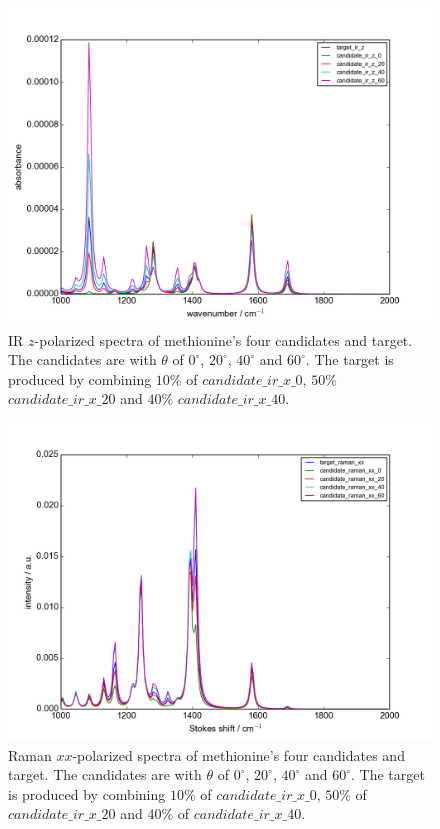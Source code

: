 \begin{figure}[!ht]
\centering
\includegraphics[scale=0.5]{Figures/Met_candidates_plotting_ir_z.png}
\caption{IR $z$-polarized spectra of methionine's four candidates and target. The candidates are with $\theta$ of $0^{\circ}$, $20^{\circ}$, $40^{\circ}$ and $60^{\circ}$. The target is produced by combining $10\%$ of $candidate\_ir\_x\_0$, $50\%$ $candidate\_ir\_x\_20$ and $40\%$ $candidate\_ir\_x\_40$.} \label{fig:2.3}
\end{figure}

\begin{figure}[!ht]
\centering
\includegraphics[scale=0.5]{Figures/Met_candidates_plotting_raman_xx.png}
\caption{Raman $xx$-polarized spectra of methionine's four candidates and target. The candidates are with $\theta$ of $0^{\circ}$, $20^{\circ}$, $40^{\circ}$ and $60^{\circ}$. The target is produced by combining $10\%$ of $candidate\_ir\_x\_0$, $50\%$ of $candidate\_ir\_x\_20$ and $40\%$ of $candidate\_ir\_x\_40$.} \label{fig:2.4}
\end{figure}

